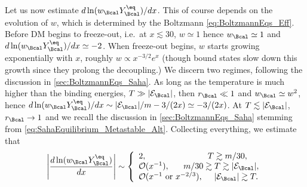 \documentclass[preprint,5p,twocolumn]{elsarticle}
\begin{document}
Let us now estimate $d \ln (w_{\Bcal} Y_{\Bcal}^{\eq}) / dx$.  This of course depends on the evolution of $w$, which is determined by the Boltzmann \cref{eq:BoltzmannEqs_Eff}. 
Before DM begins to freeze-out, i.e.~at $x \lesssim 30$, $w \simeq 1$ hence $w_{\Bcal} \simeq 1$ and $d \ln (w_{\Bcal} Y_{\Bcal}^{\eq}) / dx \simeq -2$. 
When freeze-out begins, $w$ starts growing exponentially with $x$, roughly $w \propto x^{-3/2}e^x$ (though bound states slow down this growth since they prolong the decoupling.) We discern two regimes, following the discussion in \cref{sec:BoltzmannEqs_Saha}. 
As long as the temperature is much higher than the binding energies, $T \gg |{\cal E}_{\Bcal}|$, then $r_{\Bcal} \ll 1$ and $w_{\Bcal} \simeq w^2$, hence 
$d\ln (w_{\Bcal} Y_{\Bcal}^{\eq}) /dx \sim  |{\cal E}_{\Bcal}|/m - 3/(2x) \simeq  - 3/(2x)$. 
At $T \lesssim |{\cal E}_{\Bcal}|$, $r_{\Bcal} \to 1$ and we recall the discussion in \cref{sec:BoltzmannEqs_Saha} stemming from \cref{eq:SahaEquilibrium_Metastable_Alt}. Collecting everything, we estimate that
%
%
\begin{align}
\left| \dfrac{d \ln (w_{\Bcal} Y_{\Bcal}^{\eq})}{dx} \right|
\sim  \left\{ 
\begin{array}{lr}
2,\qquad\qquad\qquad\quad~ 
T \gtrsim m/30, 
\\
{\cal O} (x^{-1}), \quad~~
m/30 \gtrsim T \gtrsim |{\cal E}_{\Bcal}|,  
\\
{\cal O} (x^{-1}~\text{or}~x^{-2/3}),\quad~
|{\cal E}_{\Bcal}|\gtrsim T.
\end{array}
\right.
\label{eq:dwB/dx}
\end{align}
\end{document}
